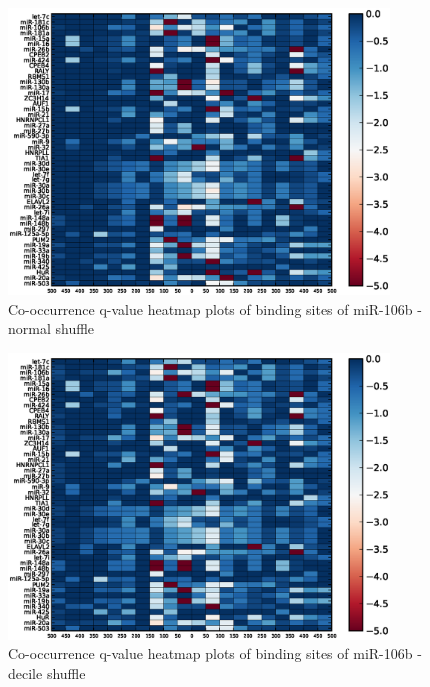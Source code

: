 \begin{figure}
	\includegraphics[width=0.9\textwidth,clip]{appendix1/figures/miR-106b_normal_expressed_heatmap_qvalues0.eps}
	\caption{Co-occurrence q-value heatmap plots of binding sites of miR-106b - normal shuffle}
\end{figure}
\clearpage
\begin{figure}
	\includegraphics[width=0.9\textwidth,clip]{appendix1/figures/miR-106b_decile_expressed_heatmap_qvalues0.eps}
	\caption{Co-occurrence q-value heatmap plots of binding sites of miR-106b - decile shuffle}
\end{figure}

